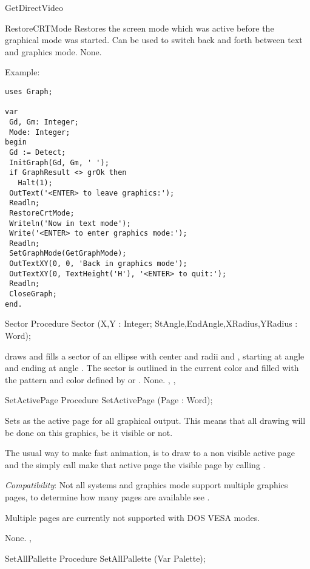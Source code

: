 \begin{function}{GetDirectVideo}
\begin{procedure}{RestoreCRTMode}
\Description
Restores the screen mode which was active before
the graphical mode was started. Can be used to switch back and forth
between text and graphics mode.
\Errors
None.
\SeeAlso
{}


\end{procedure}

Example:
\begin{verbatim}
uses Graph;

var
 Gd, Gm: Integer;
 Mode: Integer;
begin
 Gd := Detect;
 InitGraph(Gd, Gm, ' ');
 if GraphResult <> grOk then
   Halt(1);
 OutText('<ENTER> to leave graphics:');
 Readln;
 RestoreCrtMode;
 Writeln('Now in text mode');
 Write('<ENTER> to enter graphics mode:');
 Readln;
 SetGraphMode(GetGraphMode);
 OutTextXY(0, 0, 'Back in graphics mode');
 OutTextXY(0, TextHeight('H'), '<ENTER> to quit:');
 Readln;
 CloseGraph;
end.
\end{verbatim}
\begin{procedure}{Sector}
\Declaration
Procedure Sector (X,Y : Integer; StAngle,EndAngle,XRadius,YRadius : Word);

\Description
{}
draws and fills a sector of an ellipse  with center  and radii
 and , starting at angle  and ending at angle
. The sector is outlined in the current color and filled with
the pattern and color defined by  or .
\Errors
None.
\SeeAlso
{}, , 
\end{procedure}
\begin{procedure}{SetActivePage}
\Declaration
Procedure SetActivePage (Page : Word);

\Description
Sets  as the active page
for all graphical output. This means that all drawing will be done on this
graphics, be it visible or not.

The usual way to make fast animation, is to draw to a non visible active page
and the simply call make that active page the visible page by calling
.

\textit{Compatibility}:
Not all systems and graphics mode support multiple graphics pages, to
determine how many pages are available see .

Multiple pages are currently not supported with DOS VESA modes.

\Errors
None.
\SeeAlso
{}, 

\end{procedure}
\begin{procedure}{SetAllPallette}
\Declaration
Procedure SetAllPallette (Var Palette);


\end{procedure}
\end{function}
